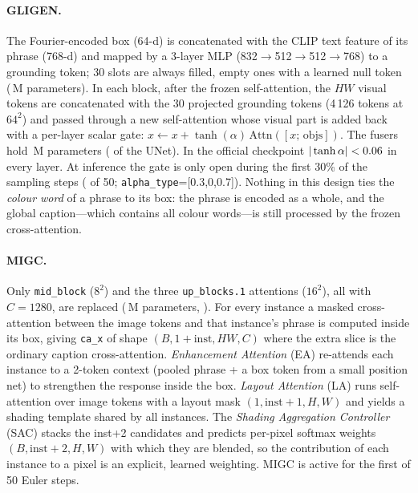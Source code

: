 \documentclass[10pt,twocolumn]{article}
\begin{document}
\paragraph{GLIGEN.} The Fourier-encoded box (64-d) is concatenated with the CLIP text feature of its phrase (768-d) and mapped by a 3-layer MLP (832$\to$512$\to$512$\to$768) to a grounding token; 30 slots are always filled, empty ones with a learned null token (\PosNetParamsM\,M parameters). In each block, after the frozen self-attention, the $HW$ visual tokens are concatenated with the 30 projected grounding tokens (4\,126 tokens at $64^2$) and passed through a new self-attention whose visual part is added back with a per-layer scalar gate: $x \leftarrow x + \tanh(\alpha)\,\mathrm{Attn}([x;\,\mathrm{objs}])$. The \FuserCount{} fusers hold \FuserParamsM\,M parameters (\FuserFrac{} of the UNet). In the official checkpoint $|\tanh\alpha|<0.06$ in every layer. At inference the gate is only open during the first 30\% of the sampling steps (\GligenSteps{} of 50; \texttt{alpha\_type}=[0.3,0,0.7]). Nothing in this design ties the \emph{colour word} of a phrase to its box: the phrase is encoded as a whole, and the global caption---which contains all colour words---is still processed by the frozen cross-attention.

\paragraph{MIGC.} Only \texttt{mid\_block} ($8^2$) and the three \texttt{up\_blocks.1} attentions ($16^2$), all with $C{=}1280$, are replaced (\MigcParamsM\,M parameters, \MigcFrac). For every instance a masked cross-attention between the image tokens and that instance's phrase is computed inside its box, giving \texttt{ca\_x} of shape $(B,1{+}\text{inst},HW,C)$ where the extra slice is the ordinary caption cross-attention. \emph{Enhancement Attention} (EA) re-attends each instance to a 2-token context (pooled phrase + a box token from a small position net) to strengthen the response inside the box. \emph{Layout Attention} (LA) runs self-attention over image tokens with a layout mask $(1,\text{inst}{+}1,H,W)$ and yields a shading template shared by all instances. The \emph{Shading Aggregation Controller} (SAC) stacks the inst{+}2 candidates and predicts per-pixel softmax weights $(B,\text{inst}{+}2,H,W)$ with which they are blended, so the contribution of each instance to a pixel is an explicit, learned weighting. MIGC is active for the first \MigcSteps{} of 50 Euler steps.
\end{document}
